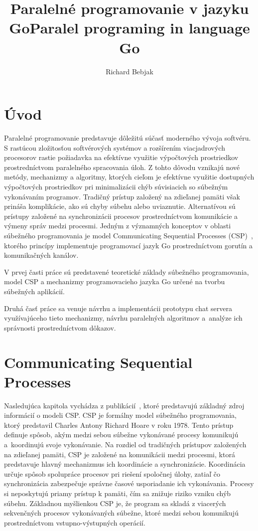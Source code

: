 \documentclass[
  biblatex,
  seconds=true,
  language=slovak,
  figures=false,
  urldate=iso,
  glossaries,
  index
]{kidiplom}
\title{Paralelné programovanie v jazyku Go}
\title[english]{Paralel programing in language Go}
\author{Richard Bebjak}
\begin{document}
\maketitle
\listoffigures
\newpage
\lstlistoflistings
\newcommand{\BibLaTeX}{\textsc{Bib}\LaTeX}
\renewcommand{\lstlistingname}{Ukážkový kód}

\newpage
\section{Úvod}
Paralelné programovanie predstavuje dôležitú súčasť moderného vývoja softvéru. S rastúcou zložitosťou softvérových systémov a rozšírením viacjadrových procesorov rastie požiadavka na efektívne využitie výpočtových prostriedkov prostredníctvom paralelného spracovania úloh. Z tohto dôvodu vznikajú nové metódy, mechanizmy a algoritmy, ktorých cieľom je efektívne využitie dostupných výpočtových prostriedkov pri minimalizácii chýb súvisiacich so súbežným vykonávaním programov. Tradičný prístup založený na zdieľanej pamäti však prináša komplikácie, ako sú chyby súbehu alebo uviaznutie. Alternatívou sú prístupy založené na synchronizácii procesov prostredníctvom komunikácie a výmeny správ medzi procesmi. Jedným z významných konceptov v oblasti súbežného programovania je model Communicating Sequential Processes (CSP)~\cite{hoare1978s}, ktorého princípy implementuje programovací jazyk Go prostredníctvom gorutín a komunikačných kanálov.

V prvej časti práce sú predstavené teoretické základy súbežného programovania, model CSP a mechanizmy programovacieho jazyka Go určené na tvorbu súbežných aplikácií. 

Druhá časť práce sa venuje návrhu a implementácii prototypu chat servera využívajúceho tieto mechanizmy, návrhu paralelných algoritmov a~analýze ich správnosti prostredníctvom dôkazov.

\newpage
\section{Communicating Sequential Processes}
Nasledujúca kapitola vychádza z publikácií~\cite{hoare1978,hoare1978s}, ktoré predstavujú základný zdroj informácií o modeli CSP.
CSP je formálny model súbežného programovania, ktorý predstavil Charles Antony Richard Hoare v roku 1978.
Tento prístup definuje spôsob, akým medzi sebou súbežne vykonávané procesy komunikujú a~koordinujú svoje vykonávanie. Na rozdiel od tradičných prístupov založených
na zdieľanej pamäti, CSP je založené na komunikácii medzi procesmi, ktorá predstavuje hlavný mechanizmus ich koordinácie a synchronizácie. Koordinácia určuje spôsob spolupráce procesov pri riešení spoločnej úlohy, zatiaľ čo synchronizácia zabezpečuje správne časové usporiadanie ich vykonávania. 
Procesy si neposkytujú priamy
prístup k pamäti, čím sa znižuje riziko vzniku chýb súbehu. Základnou myšlienkou CSP je, že program sa skladá z viacerých sekvenčných procesov
vykonávaných súbežne, ktoré medzi sebou komunikujú prostredníctvom vstupno-výstupných operácií.
\end{document}
